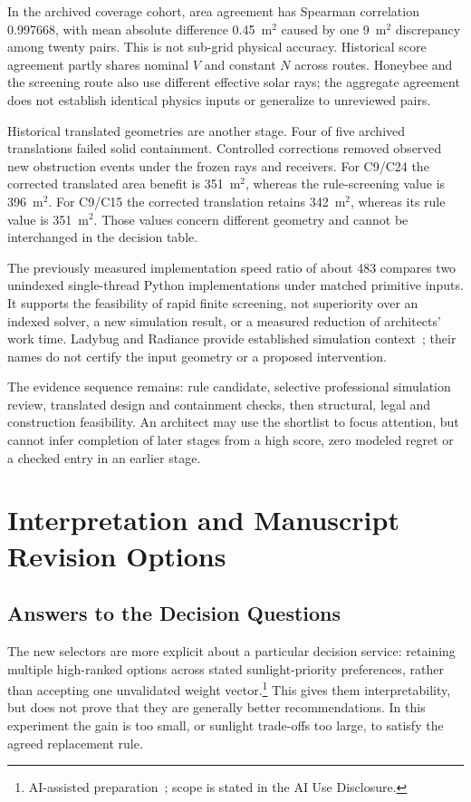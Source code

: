 \documentclass{llncs}
\newcommand{\aidraft}{\footnote{AI-assisted preparation~\cite{openai2026}; scope is stated in the AI Use Disclosure.}}
\begin{document}
In the archived coverage cohort, area agreement has Spearman correlation 0.997668, with mean absolute difference 0.45~m$^2$ caused by one 9~m$^2$ discrepancy among twenty pairs. This is not sub-grid physical accuracy. Historical score agreement partly shares nominal $V$ and constant $N$ across routes. Honeybee and the screening route also use different effective solar rays; the aggregate agreement does not establish identical physics inputs or generalize to unreviewed pairs.

Historical translated geometries are another stage. Four of five archived translations failed solid containment. Controlled corrections removed observed new obstruction events under the frozen rays and receivers. For C9/C24 the corrected translated area benefit is 351~m$^2$, whereas the rule-screening value is 396~m$^2$. For C9/C15 the corrected translation retains 342~m$^2$, whereas its rule value is 351~m$^2$. Those values concern different geometry and cannot be interchanged in the decision table.

The previously measured implementation speed ratio of about 483 compares two unindexed single-thread Python implementations under matched primitive inputs. It supports the feasibility of rapid finite screening, not superiority over an indexed solver, a new simulation result, or a measured reduction of architects' work time. Ladybug and Radiance provide established simulation context~\cite{roudsari2013ladybug,ward1994radiance}; their names do not certify the input geometry or a proposed intervention.

The evidence sequence remains: rule candidate, selective professional simulation review, translated design and containment checks, then structural, legal and construction feasibility. An architect may use the shortlist to focus attention, but cannot infer completion of later stages from a high score, zero modeled regret or a checked entry in an earlier stage.

\section{Interpretation and Manuscript Revision Options}
\subsection{Answers to the Decision Questions}
The new selectors are more explicit about a particular decision service: retaining multiple high-ranked options across stated sunlight-priority preferences, rather than accepting one unvalidated weight vector.\aidraft{} This gives them interpretability, but does not prove that they are generally better recommendations. In this experiment the gain is too small, or sunlight trade-offs too large, to satisfy the agreed replacement rule.
\end{document}
